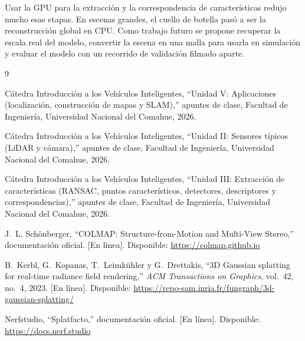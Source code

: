 \documentclass[conference,a4paper]{IEEEtran}
\begin{document}
Usar la GPU para la extracción y la correspondencia de características redujo mucho esas etapas. En escenas grandes, el cuello de botella pasó a ser la reconstrucción global en CPU. Como trabajo futuro se propone recuperar la escala real del modelo, convertir la escena en una malla para usarla en simulación y evaluar el modelo con un recorrido de validación filmado aparte.

\begin{thebibliography}{9}

Cátedra Introducción a los Vehículos Inteligentes, ``Unidad V: Aplicaciones (localización, construcción de mapas y SLAM),'' apuntes de clase, Facultad de Ingeniería, Universidad Nacional del Comahue, 2026.

Cátedra Introducción a los Vehículos Inteligentes, ``Unidad II: Sensores típicos (LiDAR y cámara),'' apuntes de clase, Facultad de Ingeniería, Universidad Nacional del Comahue, 2026.

Cátedra Introducción a los Vehículos Inteligentes, ``Unidad III: Extracción de características (RANSAC, puntos característicos, detectores, descriptores y correspondencias),'' apuntes de clase, Facultad de Ingeniería, Universidad Nacional del Comahue, 2026.

J.~L. Schönberger, ``COLMAP: Structure-from-Motion and Multi-View Stereo,'' documentación oficial. [En línea]. Disponible: \url{https://colmap.github.io}

B.~Kerbl, G.~Kopanas, T.~Leimkühler y G.~Drettakis, ``3D Gaussian splatting for real-time radiance field rendering,'' \textit{ACM Transactions on Graphics}, vol.~42, no.~4, 2023. [En línea]. Disponible: \url{https://repo-sam.inria.fr/fungraph/3d-gaussian-splatting/}

Nerfstudio, ``Splatfacto,'' documentación oficial. [En línea]. Disponible: \url{https://docs.nerf.studio}

\end{thebibliography}
\end{document}
